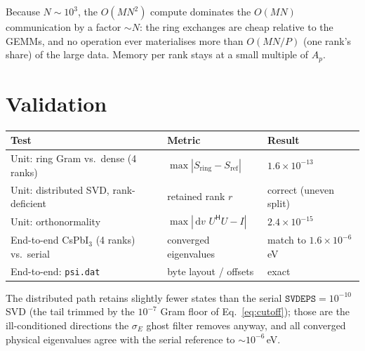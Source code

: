 \documentclass[11pt]{article}
\newcommand{\dv}{\,\mathrm{d}v\,}
\newcommand{\Herm}{^{\mathsf{H}}}
\begin{document}
Because $N\!\sim\!10^{3}$, the $O(MN^2)$ compute dominates the $O(MN)$
communication by a factor $\sim N$: the ring exchanges are cheap relative to the
GEMMs, and no operation ever materialises more than $O(MN/P)$ (one rank's share)
of the large data. Memory per rank stays at a small multiple of $A_p$.

\section{Validation}

\begin{center}
\renewcommand{\arraystretch}{1.25}
\begin{tabular}{@{}lll@{}}
\toprule
Test & Metric & Result \\
\midrule
Unit: ring Gram vs.\ dense (4 ranks)          & $\max|S_{\text{ring}}-S_{\text{ref}}|$ & $1.6\times10^{-13}$ \\
Unit: distributed SVD, rank-deficient         & retained rank $r$ & correct (uneven split) \\
Unit: orthonormality                          & $\max|\dv\,U\Herm U-I|$ & $2.4\times10^{-15}$ \\
End-to-end CsPbI$_3$ (4 ranks) vs.\ serial    & converged eigenvalues & match to $1.6\times10^{-6}$\,eV \\
End-to-end: \texttt{psi.dat}                   & byte layout / offsets & exact \\
\bottomrule
\end{tabular}
\end{center}

\noindent
The distributed path retains slightly fewer states than the serial
$\texttt{SVDEPS}=10^{-10}$ SVD (the tail trimmed by the $10^{-7}$ Gram floor of
Eq.~\ref{eq:cutoff}); those are the ill-conditioned directions the $\sigma_E$
ghost filter removes anyway, and all converged physical eigenvalues agree with
the serial reference to $\sim\!10^{-6}$\,eV.
\end{document}
